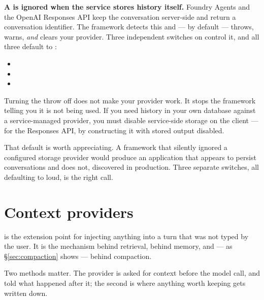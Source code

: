 \begin{warning}
\textbf{A  is ignored when the service stores history
itself.} Foundry Agents and the OpenAI Responses API keep the conversation
server-side and return a conversation identifier. The framework detects this and
--- by default --- throws, warns, \emph{and} clears your provider. Three
independent switches on  control it, and all three
default to :

\begin{itemize}[leftmargin=1.4em,nosep]
\item {}
\item {}
\item {}
\end{itemize}

\medskip
Turning the throw off does not make your provider work. It stops the framework
telling you it is not being used. If you need history in your own database
against a service-managed provider, you must disable service-side storage on the
client --- for the Responses API, by constructing it with stored output disabled.
\end{warning}

That default is worth appreciating. A framework that silently ignored a
configured storage provider would produce an application that appears to persist
conversations and does not, discovered in production. Three separate switches,
all defaulting to loud, is the right call.

\section{Context providers}
\label{sec:context-providers}

 is the extension point for injecting anything into a turn
that was not typed by the user. It is the mechanism behind retrieval, behind
memory, and --- as \S\ref{sec:compaction} shows --- behind compaction.

Two methods matter. The provider is asked for context before the model call, and
told what happened after it; the second is where anything worth keeping gets
written down.

